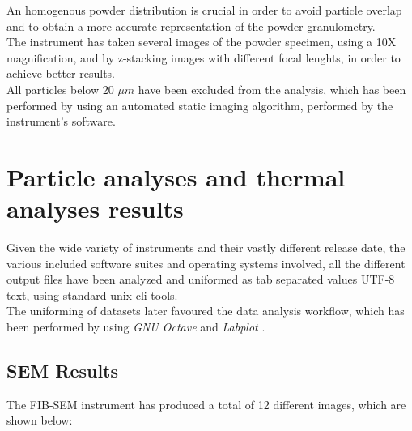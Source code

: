 \documentclass{article}
\begin{document}
        An homogenous powder distribution is crucial in order to avoid particle overlap and to obtain a more accurate 
        representation of the powder granulometry. \\ 

        The instrument has taken several images of the powder specimen, using a 10X magnification, and by z-stacking 
        images with different focal lenghts, in order to achieve better results. \\

        All particles below 20 $\mu m$ have been excluded from the analysis, which has been performed by using an automated 
        static imaging algorithm, performed by the instrument's software. \\ 

      \clearpage

      \section{Particle analyses and thermal analyses results\label{analyses_results_general}}

      Given the wide variety of instruments and their vastly different release date, the various included software suites and operating systems involved,
      all the different output files have been analyzed and uniformed as tab separated values UTF-8 text, using standard unix cli tools. \\ 
      
      The uniforming of datasets later favoured the data analysis workflow, which has been performed by using \textit{GNU Octave} \autocites{Octave} and \textit{Labplot} \autocites{Labplot}. \\

      \subsection{SEM Results\label{SEM_analysis_results}}

                
      The FIB-SEM instrument has produced a total of 12 different images, which are shown below: \\
\end{document}
